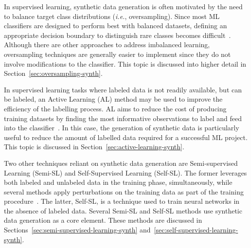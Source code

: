 In supervised learning, synthetic data generation is often motivated by the
need to balance target class distributions (\textit{i.e.}, oversampling).
Since most ML classifiers are designed to perform best with balanced datasets,
defining an appropriate decision boundary to distinguish rare classes becomes
difficult~\cite{saez2016analyzing}. Although there are other approaches to
address imbalanced learning, oversampling techniques are generally easier to
implement since they do not involve modifications to the classifier. This
topic is discussed into higher detail in Section~\ref{sec:oversampling-synth}.

In supervised learning tasks where labeled data is not readily available, but
can be labeled, an Active Learning (AL) method may be used to improve the
efficiency of the labelling process. AL aims to reduce the cost of producing
training datasets by finding the most informative observations to label and
feed into the classifier~\cite{fonseca2021increasing}. In this case, the
generation of synthetic data is particularly useful to reduce the amount of
labelled data required for a successful ML project. This topic is discussed in
Section~\ref{sec:active-learning-synth}.

Two other techniques reliant on synthetic data generation are Semi-supervised
Learning (Semi-SL) and Self-Supervised Learning (Self-SL). The former
leverages both labeled and unlabeled data in the training phase,
simultaneously, while several methods apply perturbations on the training data
as part of the training procedure~\cite{van2020survey}. The latter, Self-SL,
is a technique used to train neural networks in the absence of labeled data.
Several Semi-SL and Self-SL methods use synthetic data generation as a core
element. These methods are discussed in
Sections~\ref{sec:semi-supervised-learning-synth}
and~\ref{sec:self-supervised-learning-synth}.



 
 
